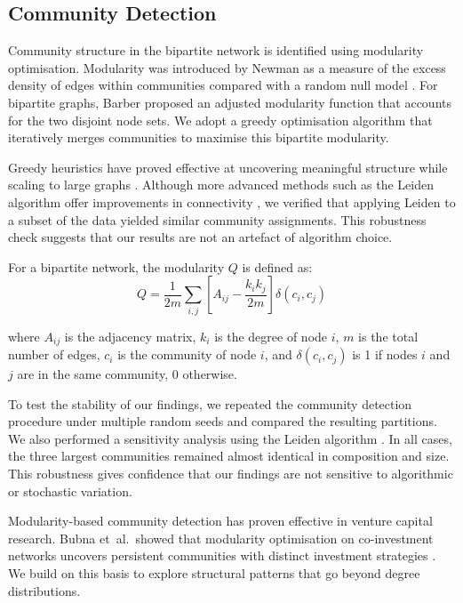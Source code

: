 \subsection{Community Detection}

Community structure in the bipartite network is identified using modularity optimisation. Modularity was introduced by Newman as a measure of the excess density of edges within communities compared with a random null model \cite{Newman2003}. For bipartite graphs, Barber \cite{Barber2007} proposed an adjusted modularity function that accounts for the two disjoint node sets. We adopt a greedy optimisation algorithm that iteratively merges communities to maximise this bipartite modularity. 

Greedy heuristics have proved effective at uncovering meaningful structure while scaling to large graphs \cite{Blondel2008}. Although more advanced methods such as the Leiden algorithm offer improvements in connectivity \cite{Traag2019}, we verified that applying Leiden to a subset of the data yielded similar community assignments. This robustness check suggests that our results are not an artefact of algorithm choice.

For a bipartite network, the modularity $Q$ is defined as:
\begin{equation}
Q = \frac{1}{2m} \sum_{i,j} \left[ A_{ij} - \frac{k_i k_j}{2m} \right] \delta(c_i, c_j)
\end{equation}

where $A_{ij}$ is the adjacency matrix, $k_i$ is the degree of node $i$, $m$ is the total number of edges, $c_i$ is the community of node $i$, and $\delta(c_i, c_j)$ is 1 if nodes $i$ and $j$ are in the same community, 0 otherwise.

To test the stability of our findings, we repeated the community detection procedure under multiple random seeds and compared the resulting partitions. We also performed a sensitivity analysis using the Leiden algorithm \cite{Traag2019}. In all cases, the three largest communities remained almost identical in composition and size. This robustness gives confidence that our findings are not sensitive to algorithmic or stochastic variation.

Modularity-based community detection has proven effective in venture capital research. Bubna et~al.\ showed that modularity optimisation on co-investment networks uncovers persistent communities with distinct investment strategies \cite{Bubna2020}. We build on this basis to explore structural patterns that go beyond degree distributions.

